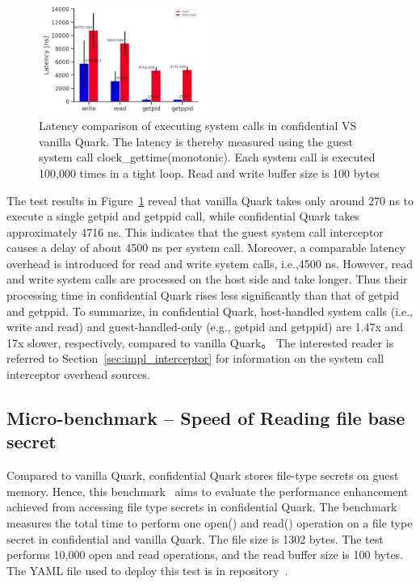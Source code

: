 \begin{figure}[!htb]
    \centering
    \includegraphics[width=0.5\textwidth]{images/ben_results_syscall_interceptor.PNG}
    \caption[Benchmark result of Syscall Interceptor]{Latency comparison of executing system calls in confidential VS vanilla Quark. The latency is thereby measured using the guest system call clock\_gettime(monotonic). 
        Each system call is executed 100,000  times in a tight loop. Read and write buffer size is 100 bytes}
    \label{fig:ben_results_syscall_interceptor}
\end{figure}

The test results in Figure~\ref{fig:ben_results_syscall_interceptor} reveal that vanilla Quark takes only around 270 ns to execute a single getpid and getppid call, while confidential Quark takes approximately 4716 ns. This indicates that the guest system call interceptor causes a delay of about 4500 ns per system call. Moreover, a 
comparable latency overhead is introduced for read and write system calls, i.e.,4500 ns. However, read and write system calls are processed on the host side and take longer. Thus their processing time in confidential Quark rises less significantly than that of getpid and getppid. To summarize, in 
confidential Quark, host-handled system calls (i.e., write and read) and guest-handled-only (e.g., getpid and getppid) are 1.47x and 17x slower, respectively, compared to vanilla Quark。 The interested reader is referred to Section~\ref{sec:impl_interceptor} for information on the system call 
interceptor overhead sources.

\subsection{Micro-benchmark – Speed of Reading file base secret}\label{bench_reading_file_secret}

Compared to vanilla Quark, confidential Quark stores file-type secrets on guest memory. Hence, this benchmark~\cite*{benchamark_filebase_secret}  aims to evaluate the performance enhancement achieved from accessing file type secrets in confidential Quark. 
The benchmark measures the total time to perform one open() and read() operation on a file type secret in confidential and vanilla Quark. The file size is 1302 bytes. The test performs 10,000 open and read operations, and the read buffer size is 100 bytes. The YAML file used to deploy this test 
is in repository~\cite*{perf_test_repo}.

